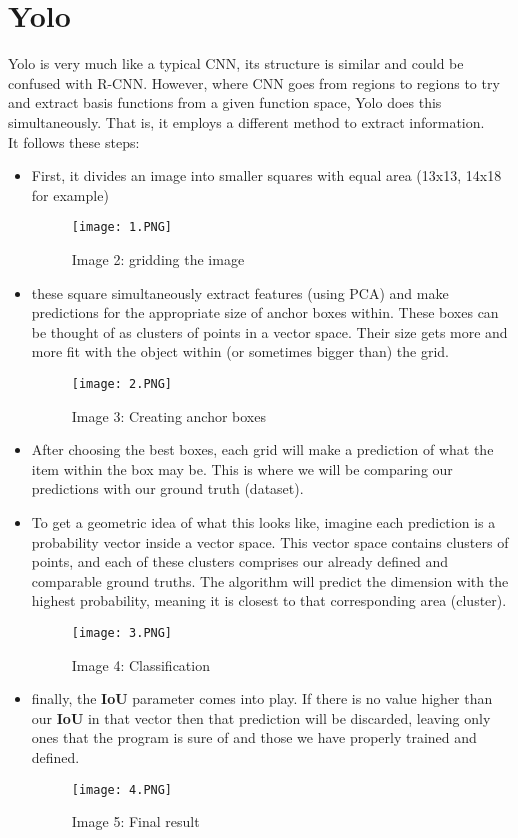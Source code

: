 \documentclass{article}
\begin{document}
\section{Yolo}
Yolo is very much like a typical CNN, its structure is similar and could be confused with R-CNN. However, where CNN goes from regions to regions to try and extract basis functions from a given function space, Yolo does this simultaneously. That is, it employs a different method to extract information.\\
It follows these steps:
\begin{itemize}
	\item First, it divides an image into smaller squares with equal area (13x13, 14x18 for example)
	\begin{figure}[h]
		\centerline{\texttt{[image: 1.PNG]}}
		\caption*{Image 2: gridding the image}
	\end{figure}
	\item these square simultaneously extract features (using PCA) and make predictions for the appropriate size of anchor boxes within. These boxes can be thought of as clusters of points in a vector space. Their size gets more and more fit with the object within (or sometimes bigger than) the grid.
	\begin{figure}[h]
		\centerline{\texttt{[image: 2.PNG]}}
		\caption*{Image 3: Creating anchor boxes}
	\end{figure}
	\item After choosing the best boxes, each grid will make a prediction of what the item within the box may be. This is where we will be comparing our predictions with our ground truth (dataset).
	\item To get a geometric idea of what this looks like, imagine each prediction is a probability vector inside a vector space. This vector space contains clusters of points, and each of these clusters comprises our already defined and comparable ground truths. The algorithm will predict the dimension with the highest probability, meaning it is closest to that corresponding area (cluster).
	\begin{figure}[h]
		\centerline{\texttt{[image: 3.PNG]}}
		\caption*{Image 4: Classification}
	\end{figure}	 
	\item finally, the \textbf{IoU} parameter comes into play. If there is no value higher than our \textbf{IoU} in that vector then that prediction will be discarded, leaving only ones that the program is sure of and those we have properly trained and defined.
	\begin{figure}[h]
		\centerline{\texttt{[image: 4.PNG]}}
		\caption*{Image 5: Final result}
	\end{figure}
\end{itemize}
\end{document}
